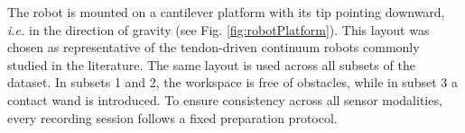 \documentclass[14pt, a4paper]{article}
\newcommand{\ie}{\textit{i.e.}}
\begin{document}
The robot is mounted on a cantilever platform with its tip pointing downward, \ie{} in the direction of gravity (see Fig. \ref{fig:robotPlatform}). %
This layout was chosen as representative of the tendon-driven continuum robots commonly studied in the literature.
%
The same layout is used across all subsets of the dataset.
In subsets 1 and 2, the workspace is free of obstacles, while in subset 3 a contact wand is introduced.
To ensure consistency across all sensor modalities, every recording session follows a fixed preparation protocol.

\end{document}

